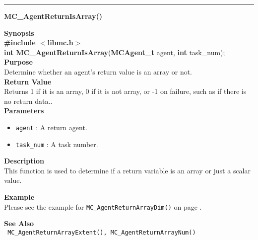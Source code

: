 \noindent
\vspace{5pt}
\rule{6.5in}{0.015in}
\noindent
{}
{\LARGE \bf MC\_AgentReturnIsArray()}\\
\label{api:MC_AgentReturnIsArray()}

\noindent
{\bf Synopsis}\\
{\bf \#include $<$libmc.h$>$}\\
{\bf int MC\_AgentReturnIsArray}({\bf MCAgent\_t} agent, {\bf int} task\_num);\\

\noindent
{\bf Purpose}\\
Determine whether an agent's return value is an array or not.\\

\noindent
{\bf Return Value}\\
Returns 1 if it is an array, 0 if it is not array, or -1 on failure, such as if
there is no return data..\\

\noindent
{\bf Parameters}
\begin{itemize}
\item \texttt{agent} : A return agent.
\item \texttt{task\_num} : A task number.
\end{itemize}


\noindent
{\bf Description}\\
This function is used to determine if a return variable is an array or just a
scalar value.

\noindent
{\bf Example}\\
\noindent
Please see the example for \texttt{MC\_AgentReturnArrayDim()} on page \pageref{api:MC_AgentReturnArrayDim()}.

\noindent
{\bf See Also}\\
\texttt{
  MC\_AgentReturnArrayExtent(), MC\_AgentReturnArrayNum()
}

